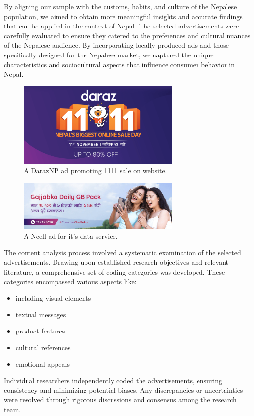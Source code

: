 \documentclass[journal]{IEEEtran}
\begin{document}
By aligning our sample with the customs, habits, and culture of the Nepalese population,
we aimed to obtain more meaningful insights and accurate findings that can be applied in
the context of Nepal. The selected advertisements were carefully evaluated to ensure they
catered to the preferences and cultural nuances of the Nepalese audience. By incorporating
locally produced ads and those specifically designed for the Nepalese market, we captured
the unique characteristics and sociocultural aspects that influence consumer behavior in
Nepal.

\begin{figure}[H]
    \centering
    \includegraphics[width=8cm]{daraz-sale.png}
    \caption{A DarazNP ad promoting 1111 sale on website.}
\end{figure}

\begin{figure}[H]
    \centering
    \includegraphics[width=8cm]{Ncell.png}
    \caption{A Ncell ad for it's data service.}
\end{figure}

The content analysis process involved a systematic examination of the selected
advertisements. Drawing upon established research objectives and relevant literature, a
comprehensive set of coding categories was developed.
\clearpage
These categories encompassed various aspects like:
\begin{itemize}
    \item including visual elements
    \item textual messages
    \item product features
    \item cultural references
    \item emotional appeals
\end{itemize}
Individual researchers independently coded the advertisements, ensuring consistency and
minimizing potential biases. Any discrepancies or uncertainties were resolved through
rigorous discussions and consensus among the research team.
\end{document}
